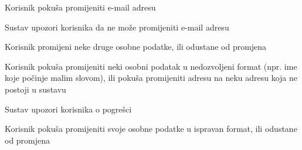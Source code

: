 \begin{packed_item}
\begin{packed_item}
							\item[3.b] Korisnik pokuša promijeniti e-mail adresu
							\item[] \begin{packed_enum}
								
								\item Sustav upozori korisnika da ne može promijeniti e-mail adresu
								\item Korisnik promijeni neke druge osobne podatke, ili odustane od promjena
								
							\end{packed_enum}
							
							\item[3.c] Korisnik pokuša promijeniti neki osobni podatak u nedozvoljeni format (npr. ime koje počinje malim slovom), ili pokuša promijeniti adresu na neku adresu koja ne postoji u sustavu
							\item[] \begin{packed_enum}
								
								\item Sustav upozori korisnika o pogrešci
								\item Korisnik pokuša promijeniti svoje osobne podatke u ispravan format, ili odustane od promjena
								
							\end{packed_enum}
							
						\end{packed_item}
					\end{packed_item}
					
